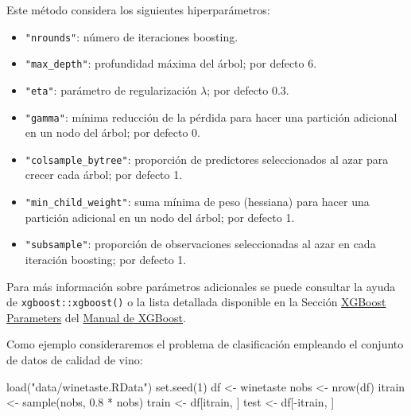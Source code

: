 \documentclass[
  spanish,
]{book}
\newenvironment{Shaded}{\begin{snugshade}}{\end{snugshade}}
\newcommand{\DecValTok}[1]{\textcolor[rgb]{0.00,0.00,0.81}{#1}}
\newcommand{\FloatTok}[1]{\textcolor[rgb]{0.00,0.00,0.81}{#1}}
\newcommand{\FunctionTok}[1]{\textcolor[rgb]{0.00,0.00,0.00}{#1}}
\newcommand{\NormalTok}[1]{#1}
\newcommand{\OtherTok}[1]{\textcolor[rgb]{0.56,0.35,0.01}{#1}}
\newcommand{\SpecialCharTok}[1]{\textcolor[rgb]{0.00,0.00,0.00}{#1}}
\newcommand{\StringTok}[1]{\textcolor[rgb]{0.31,0.60,0.02}{#1}}
\theoremstyle{break}
\theoremstyle{definition}
\theoremstyle{definition}
\theoremstyle{definition}
\theoremstyle{definition}
\theoremstyle{remark}
\begin{document}
Este método considera los siguientes hiperparámetros:

\begin{itemize}
\item
  \texttt{"nrounds"}: número de iteraciones boosting.
\item
  \texttt{"max\_depth"}: profundidad máxima del árbol; por defecto 6.
\item
  \texttt{"eta"}: parámetro de regularización \(\lambda\); por defecto 0.3.
\item
  \texttt{"gamma"}: mínima reducción de la pérdida para hacer una partición adicional en un nodo del árbol; por defecto 0.
\item
  \texttt{"colsample\_bytree"}: proporción de predictores seleccionados al azar para crecer cada árbol; por defecto 1.
\item
  \texttt{"min\_child\_weight"}: suma mínima de peso (hessiana) para hacer una partición adicional en un nodo del árbol; por defecto 1.
\item
  \texttt{"subsample"}: proporción de observaciones seleccionadas al azar en cada iteración boosting; por defecto 1.
\end{itemize}

Para más información sobre parámetros adicionales se puede consultar la ayuda de \texttt{xgboost::xgboost()} o la lista detallada disponible en la Sección \href{https://xgboost.readthedocs.io/en/latest/parameter.html}{XGBoost Parameters} del \href{https://xgboost.readthedocs.io}{Manual de XGBoost}.

Como ejemplo consideraremos el problema de clasificación empleando el conjunto de datos de calidad de vino:

\begin{Shaded}
\begin{Highlighting}[]
\FunctionTok{load}\NormalTok{(}\StringTok{"data/winetaste.RData"}\NormalTok{)}
\FunctionTok{set.seed}\NormalTok{(}\DecValTok{1}\NormalTok{)}
\NormalTok{df }\OtherTok{\textless{}{-}}\NormalTok{ winetaste}
\NormalTok{nobs }\OtherTok{\textless{}{-}} \FunctionTok{nrow}\NormalTok{(df)}
\NormalTok{itrain }\OtherTok{\textless{}{-}} \FunctionTok{sample}\NormalTok{(nobs, }\FloatTok{0.8} \SpecialCharTok{*}\NormalTok{ nobs)}
\NormalTok{train }\OtherTok{\textless{}{-}}\NormalTok{ df[itrain, ]}
\NormalTok{test }\OtherTok{\textless{}{-}}\NormalTok{ df[}\SpecialCharTok{{-}}\NormalTok{itrain, ]}
\end{Highlighting}
\end{Shaded}
\end{document}

